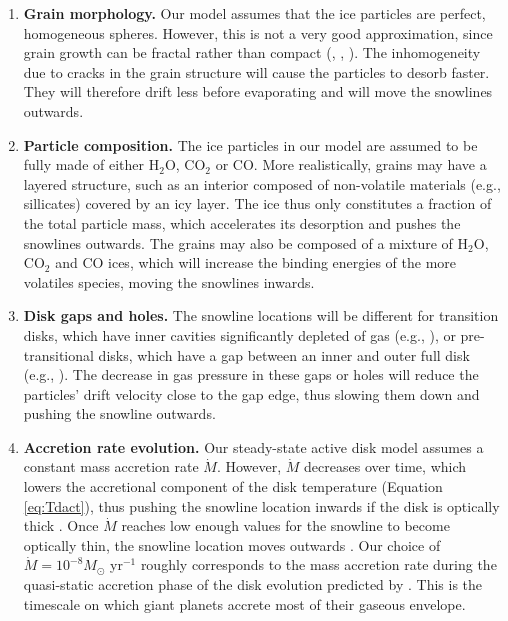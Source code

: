 \documentclass[apj]{emulateapj}
\begin{document}
\begin{enumerate}
\item \textbf{Grain morphology.} Our model assumes that the ice particles are perfect, homogeneous spheres. However, this is not a very good approximation, since grain growth can be fractal rather than compact (\citealt{zsom10}, \citealt{okuzumi12}, \citealt{krijt15}). The inhomogeneity due to cracks in the grain structure will cause the particles to desorb faster. They will therefore drift less before evaporating and will move the snowlines outwards.

\item \textbf{Particle composition.} The ice particles in our model are assumed to be fully made of either H$_2$O, CO$_2$ or CO. More realistically, grains may have a layered structure, such as an interior composed of non-volatile materials (e.g., sillicates) covered by an icy layer. The ice thus only constitutes a fraction of the total particle mass, which accelerates its desorption and pushes the snowlines outwards. The grains may also be composed of a mixture of H$_2$O, CO$_2$ and CO ices, which will increase the binding energies of the more volatiles species, moving %
the snowlines inwards. 


\item \textbf{Disk gaps and holes.} The snowline locations will be different for transition disks, which have inner cavities significantly depleted of gas (e.g., \citealt{espaillat12}), or pre-transitional disks, which have a gap between an inner and outer full disk (e.g., \citealt{kraus11}). The decrease in gas pressure in these gaps or holes will reduce the particles' drift velocity close to the gap edge, thus slowing them down and pushing the snowline outwards.

\item \textbf{Accretion rate evolution.} Our steady-state active disk model assumes a constant mass accretion rate $\dot{M}$. However, $\dot{M}$ decreases over time, which lowers the accretional component of the disk temperature (Equation \ref{eq:Tdact}), thus pushing the snowline location inwards if the disk is optically thick \citep{garaud07}. Once $\dot{M}$ reaches low enough values for the snowline to become optically thin, the snowline location moves outwards \citep{garaud07}. Our choice of $\dot{M}=10^{-8} M_{\odot}$ yr$^{-1}$ roughly corresponds to the mass accretion rate during the quasi-static accretion phase of the disk evolution predicted by \citet{garaud07}. This is the timescale on which giant planets accrete most of their gaseous envelope.%


\end{enumerate}
\end{document}
